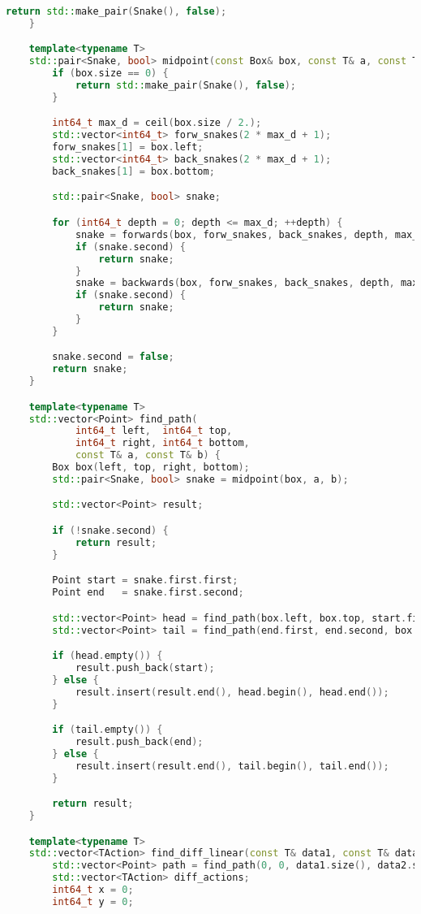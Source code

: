 \begin{lstlisting}[language=C++]
        return std::make_pair(Snake(), false);
    }

    template<typename T>
    std::pair<Snake, bool> midpoint(const Box& box, const T& a, const T& b) {
        if (box.size == 0) {
            return std::make_pair(Snake(), false);
        }

        int64_t max_d = ceil(box.size / 2.);
        std::vector<int64_t> forw_snakes(2 * max_d + 1);
        forw_snakes[1] = box.left;
        std::vector<int64_t> back_snakes(2 * max_d + 1);
        back_snakes[1] = box.bottom;

        std::pair<Snake, bool> snake;

        for (int64_t depth = 0; depth <= max_d; ++depth) {
            snake = forwards(box, forw_snakes, back_snakes, depth, max_d, a, b);
            if (snake.second) {
                return snake;
            }
            snake = backwards(box, forw_snakes, back_snakes, depth, max_d, a, b);
            if (snake.second) {
                return snake;
            }
        }

        snake.second = false;
        return snake;
    }

    template<typename T>
    std::vector<Point> find_path(
            int64_t left,  int64_t top, 
            int64_t right, int64_t bottom, 
            const T& a, const T& b) {
        Box box(left, top, right, bottom);
        std::pair<Snake, bool> snake = midpoint(box, a, b);

        std::vector<Point> result;

        if (!snake.second) {
            return result;
        }

        Point start = snake.first.first;
        Point end   = snake.first.second;

        std::vector<Point> head = find_path(box.left, box.top, start.first, start.second, a, b);
        std::vector<Point> tail = find_path(end.first, end.second, box.right, box.bottom, a, b);

        if (head.empty()) {
            result.push_back(start);
        } else {
            result.insert(result.end(), head.begin(), head.end());
        }

        if (tail.empty()) {
            result.push_back(end);
        } else {
            result.insert(result.end(), tail.begin(), tail.end());
        }

        return result;
    }

    template<typename T>
    std::vector<TAction> find_diff_linear(const T& data1, const T& data2) {
        std::vector<Point> path = find_path(0, 0, data1.size(), data2.size(), data1, data2);
        std::vector<TAction> diff_actions;
        int64_t x = 0;
        int64_t y = 0;


\end{lstlisting}
